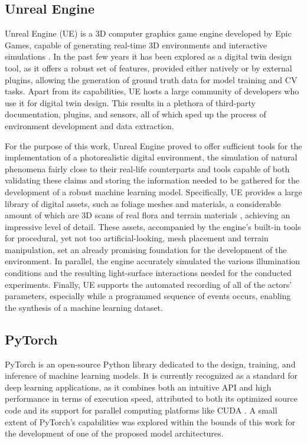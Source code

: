 \subsection{Unreal Engine}

Unreal Engine (UE) is a 3D computer graphics game engine developed by Epic Games, capable of generating real-time 3D environments and interactive simulations \cite{wiki:unreal_engine}. In the past few years it has been explored as a digital twin design tool, as it offers a robust set of features, provided either natively or by external plugins, allowing the generation of ground truth data for model training and CV tasks. Apart from its capabilities, UE hosts a large community of developers who use it for digital twin design. This results in a plethora of third-party documentation, plugins, and sensors, all of which sped up the process of environment development and data extraction.

For the purpose of this work, Unreal Engine proved to offer sufficient tools for the implementation of a photorealistic digital environment, the simulation of natural phenomena fairly close to their real-life counterparts and tools capable of both validating these claims and storing the information needed to be gathered for the development of a robust machine learning model. Specifically, UE provides a large library of digital assets, such as foliage meshes and materials, a considerable amount of which are 3D scans of real flora and terrain materials \cite{quixel_megascans}, achieving an impressive level of detail. These assets, accompanied by the engine's built-in tools for procedural, yet not too artificial-looking, mesh placement and terrain manipulation, set an already promising foundation for the development of the environment. In parallel, the engine accurately simulated the various illumination conditions and the resulting light-surface interactions needed for the conducted experiments. Finally, UE supports the automated recording of all of the actors' parameters, especially while a programmed sequence of events occurs, enabling the synthesis of a machine learning dataset. 

\subsection{PyTorch}
PyTorch is an open-source Python library dedicated to the design, training, and inference of machine learning models. It is currently recognized as a standard for deep learning applications, as it combines both an intuitive API and high performance in terms of execution speed, attributed to both its optimized source code and its support for parallel computing platforms like CUDA \cite{torch-intro}. A small extent of PyTorch's capabilities was explored within the bounds of this work for the development of one of the proposed model architectures. 

